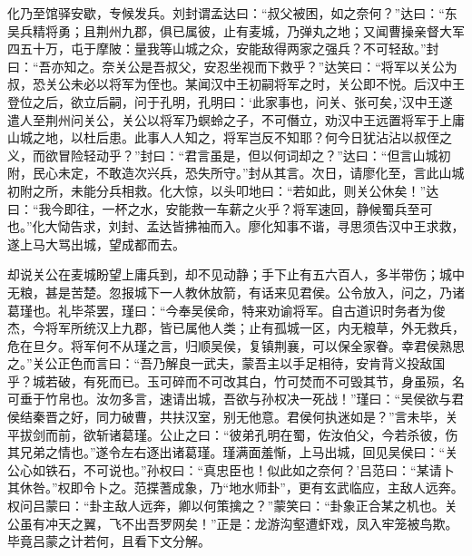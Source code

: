 化乃至馆驿安歇，专候发兵。刘封谓孟达曰：“叔父被困，如之奈何？”达曰：“东吴兵精将勇；且荆州九郡，俱已属彼，止有麦城，乃弹丸之地；又闻曹操亲督大军四五十万，屯于摩陂：量我等山城之众，安能敌得两家之强兵？不可轻敌。”封曰：“吾亦知之。奈关公是吾叔父，安忍坐视而下救乎？”达笑曰：“将军以关公为叔，恐关公未必以将军为侄也。某闻汉中王初嗣将军之时，关公即不悦。后汉中王登位之后，欲立后嗣，问于孔明，孔明曰：‘此家事也，问关、张可矣，’汉中王遂遣人至荆州问关公，关公以将军乃螟蛉之子，不可僭立，劝汉中王远置将军于上庸山城之地，以杜后患。此事人人知之，将军岂反不知耶？何今日犹沾沾以叔侄之义，而欲冒险轻动乎？”封曰：“君言虽是，但以何词却之？”达曰：“但言山城初附，民心未定，不敢造次兴兵，恐失所守。”封从其言。次日，请廖化至，言此山城初附之所，未能分兵相救。化大惊，以头叩地曰：“若如此，则关公休矣！”达曰：“我今即往，一杯之水，安能救一车薪之火乎？将军速回，静候蜀兵至可也。”化大恸告求，刘封、孟达皆拂袖而入。廖化知事不谐，寻思须告汉中王求救，遂上马大骂出城，望成都而去。

却说关公在麦城盼望上庸兵到，却不见动静；手下止有五六百人，多半带伤；城中无粮，甚是苦楚。忽报城下一人教休放箭，有话来见君侯。公令放入，问之，乃诸葛瑾也。礼毕茶罢，瑾曰：“今奉吴侯命，特来劝谕将军。自古道识时务者为俊杰，今将军所统汉上九郡，皆已属他人类；止有孤城一区，内无粮草，外无救兵，危在旦夕。将军何不从瑾之言，归顺吴侯，复镇荆襄，可以保全家眷。幸君侯熟思之。”关公正色而言曰：“吾乃解良一武夫，蒙吾主以手足相待，安肯背义投敌国乎？城若破，有死而已。玉可碎而不可改其白，竹可焚而不可毁其节，身虽殒，名可垂于竹帛也。汝勿多言，速请出城，吾欲与孙权决一死战！”瑾曰：“吴侯欲与君侯结秦晋之好，同力破曹，共扶汉室，别无他意。君侯何执迷如是？”言未毕，关平拔剑而前，欲斩诸葛瑾。公止之曰：“彼弟孔明在蜀，佐汝伯父，今若杀彼，伤其兄弟之情也。”遂令左右逐出诸葛瑾。瑾满面羞惭，上马出城，回见吴侯曰：“关公心如铁石，不可说也。”孙权曰：“真忠臣也！似此如之奈何？’吕范曰：“某请卜其休咎。”权即令卜之。范揲蓍成象，乃“地水师卦”，更有玄武临应，主敌人远奔。权问吕蒙曰：“卦主敌人远奔，卿以何策擒之？”蒙笑曰：“卦象正合某之机也。关公虽有冲天之翼，飞不出吾罗网矣！”正是：龙游沟壑遭虾戏，凤入牢笼被鸟欺。毕竟吕蒙之计若何，且看下文分解。